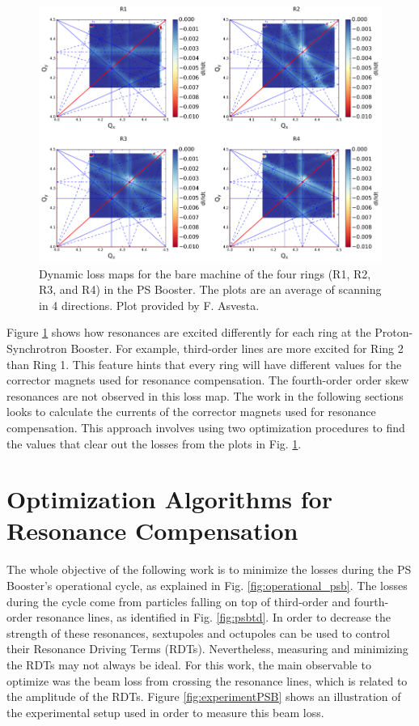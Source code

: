 \begin{figure}[H]
    \centering
    \includegraphics[width=\columnwidth]{chapter5/bare.png}
    \caption{Dynamic loss maps for the bare machine of the four rings (R1, R2, R3, and R4) in the PS Booster. The plots are an average of scanning in 4 directions. Plot provided by F. Asvesta.}
    \label{fig:bare_psb}
\end{figure}

Figure \ref{fig:bare_psb} shows how resonances are excited differently for each ring at the Proton-Synchrotron Booster. For example, third-order lines are more excited for Ring 2 than Ring 1. This feature hints that every ring will have different values for the corrector magnets used for resonance compensation. The fourth-order order skew resonances are not observed in this loss map. The work in the following sections looks to calculate the currents of the corrector magnets used for resonance compensation. This approach involves using two optimization procedures to find the values that clear out the losses from the plots in Fig. \ref{fig:bare_psb}.

\section{Optimization Algorithms for Resonance Compensation}

The whole objective of the following work is to minimize the losses during the PS Booster's operational cycle, as explained in Fig. \ref{fig:operational_psb}. The losses during the cycle come from particles falling on top of third-order and fourth-order resonance lines, as identified in Fig. \ref{fig:psbtd}. In order to decrease the strength of these resonances, sextupoles and octupoles can be used to control their Resonance Driving Terms (RDTs). Nevertheless, measuring and minimizing the RDTs may not always be ideal. For this work, the main observable to optimize was the beam loss from crossing the resonance lines, which is related to the amplitude of the RDTs. Figure \ref{fig:experimentPSB} shows an illustration of the experimental setup used in order to measure this beam loss.

